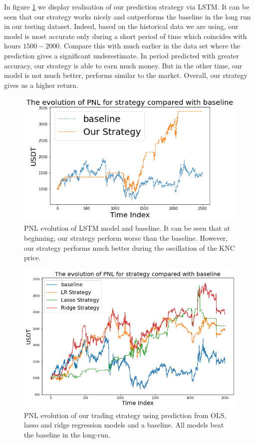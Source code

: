 \documentclass[twoside]{report}
\begin{document}
\begin{spacing}{1}
In figure \ref{fig:LSTM PNL} we display realisation of our prediction strategy via LSTM. It can be seen that our strategy works nicely and outperforms the baseline in the long run in our testing dataset. Indeed, based on the historical data we are using, our model is most accurate only during a short period of time which coincides with hours $1500-2000$. Compare this with much earlier in the data set where the prediction gives a significant underestimate. In period predicted with greater accuracy, our strategy is able to earn much money. But in the other time, our model is not much better, performs similar to the market. Overall, our strategy gives us a higher return.
\begin{figure}[!ht]
    \centering
    \includegraphics[scale = 0.7]{Images/LSTM PNL.png}
    \caption{PNL evolution of LSTM model and baseline. It can be seen that at beginning, our strategy perform worse than the baseline. However, our strategy performs much better during the oscillation of the KNC price.}
    \label{fig:LSTM PNL}
\end{figure}

\begin{figure}
    \centering
    \includegraphics[scale = 0.528]{Images/pnl for linear regression.png}
    \caption{PNL evolution of our trading strategy using prediction from OLS, lasso and ridge regression models and a baseline. All models beat the baseline in the long-run.}
    \label{fig:LR PNL}
\end{figure}




\end{spacing}
\end{document}
